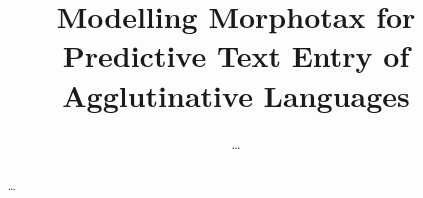 \documentclass{llncs}
\begin{document}
\title{Modelling Morphotax for Predictive Text Entry of Agglutinative 
Languages}

\author{\ldots}
\institute{\ldots\\
           \ldots\\
           \ldots\\
           \ldots}

\maketitle

\begin{abstract}

\ldots

\end{abstract}



\end{document}
